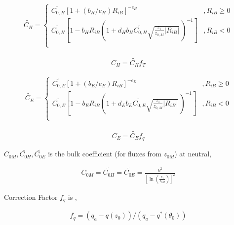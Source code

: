 \begin{eqnarray}
    \widetilde{C_H} = \left\{
      \begin{array}{lr}
      \widetilde{C_{0,H}} [ 1 + (b_H/e_H) R_{iB} ]^{-e_H}
            &,
          R_{iB} \geq 0 \\
      \widetilde{C_{0,H}} \left[ 1 - b_H R_{iB}
                                  \left( 1+ d_H b_H \widetilde{C_{0,H}}
                                  \sqrt{\frac{z_1}{z_{0,M}}| R_{iB}|} \,
                                  \right)^{-1} \right]
             &,     
          R_{iB} < 0 \\
      \end{array} \right.
\end{eqnarray}

\begin{eqnarray}
    C_H = \widetilde{C_H} f_T
\end{eqnarray}

\begin{eqnarray}
    \widetilde{C_E} = \left\{
      \begin{array}{lr}
      \widetilde{C_{0,E}} [ 1 + (b_E/e_E) R_{iB} ]^{-e_E}
            &,
          R_{iB} \geq 0 \\
      \widetilde{C_{0,E}} \left[ 1 - b_E R_{iB}
                                  \left( 1+ d_E b_E \widetilde{C_{0,E}}
                                  \sqrt{\frac{z_1}{z_{0,M}}| R_{iB}|} \,
                                  \right)^{-1} \right]      
          &,
          R_{iB} < 0 \\
      \end{array} \right.
\end{eqnarray}

\begin{eqnarray}
    C_E = \widetilde{C_E} f_q
\end{eqnarray}

\(C_{0M}, \widetilde{C_{0H}}, \widetilde{C_{0E}}\) is the bulk coefficient (for fluxes from \(z_{0M}\)) at neutral,

\begin{eqnarray}
    C_{0M}  =  \widetilde{C_{0H}}  =  \widetilde{C_{0E}}  =
       \frac{k^2}{\left[\ln \left(\frac{z_1}{z_{0M}}\right)\right]^2 }
\end{eqnarray}

Correction Factor \(f_q\) is ,

\begin{eqnarray}
  f_q = (q_a - q(z_0))/(q_a - q^{\ast}(\theta_0))
\end{eqnarray}


